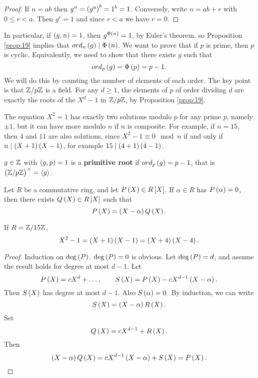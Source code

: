 \begin{proof}
If $ n = ab $ then $ g^n = \br{g^a}^b = 1^b = 1 $. Conversely, write $ n = ab + r $ with $ 0 \le r < a $. Then $ g^r = 1 $ and since $ r < a $ we have $ r = 0 $.
\end{proof}

In particular, if $ \br{g, n} = 1 $, then $ g^{\Phi\br{n}} = 1 $, by Euler's theorem, so Proposition \ref{prop:19} implies that $ ord_n\br{g} \mid \Phi\br{n} $. We want to prove that if $ p $ is prime, then $ \unit{p} $ is cyclic. Equivalently, we need to show that there exists $ g $ such that
$$ ord_p\br{g} = \Phi\br{p} = p - 1. $$
We will do this by counting the number of elements of each order. The key point is that $ \mathbb{Z} / p\mathbb{Z} $ is a field. For any $ d \ge 1 $, the elements of $ \unit{p} $ of order dividing $ d $ are exactly the roots of the $ X^d - 1 $ in $ \mathbb{Z} / p\mathbb{Z} $, by Proposition \ref{prop:19}.

\begin{example*}
The equation $ X^2 = 1 $ has exactly two solutions modulo $ p $ for any prime $ p $, namely $ \pm 1 $, but it can have more modulo $ n $ if $ n $ is composite. For example, if $ n = 15 $, then $ 4 $ and $ 11 $ are also solutions, since $ X^2 - 1 \equiv 0 \mod n $ if and only if $ n \mid \br{X + 1}\br{X - 1} $, for example $ 15 \mid \br{4 + 1}\br{4 - 1} $.
\end{example*}

\begin{definition}
$ g \in \mathbb{Z} $ with $ \br{g, p} = 1 $ is a \textbf{primitive root} if $ ord_p\br{g} = p - 1 $, that is $ \unit{p} = \abr{g} $.
\end{definition}

\begin{lemma}
\label{lem:21}
Let $ R $ be a commutative ring, and let $ P\br{X} \in R\sbr{X} $. If $ \alpha \in R $ has $ P\br{\alpha} = 0 $, then there exists $ Q\br{X} \in R\sbr{X} $ such that
$$ P\br{X} = \br{X - \alpha}Q\br{X}. $$
\end{lemma}

\begin{example*}
If $ R = \mathbb{Z} / 15\mathbb{Z} $,
$$ X^2 - 1 = \br{X + 1}\br{X - 1} = \br{X + 4}\br{X - 4}. $$
\end{example*}

\begin{proof}
Induction on $ \deg\br{P} $. $ \deg\br{P} = 0 $ is obvious. Let $ \deg\br{P} = d $, and assume the result holds for degree at most $ d - 1 $. Let
$$ P\br{X} = cX^d + \dots, \qquad S\br{X} = P\br{X} - cX^{d - 1}\br{X - \alpha}. $$
Then $ S\br{X} $ has degree at most $ d - 1 $. Also $ S\br{\alpha} = 0 $. By induction, we can write
$$ S\br{X} = \br{X - \alpha}R\br{X}. $$
Set
$$ Q\br{X} = cX^{d - 1} + R\br{X}. $$
Then
$$ \br{X - \alpha}Q\br{X} = cX^{d - 1}\br{X - \alpha} + S\br{X} = P\br{X}. $$
\end{proof}

